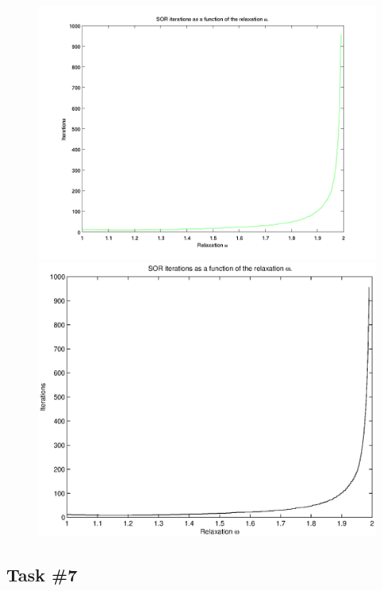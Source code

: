 \documentclass[10pt, a4paper]{article}
\begin{document}
\begin{figure}[hbt]
\begin{center}
\ifpdf
	\includegraphics[width=\linewidth]{../img/task6_plot.png}
\else
	\includegraphics[width=\linewidth]{../img/task6_plot.eps}
\fi
\end{center}
\label{fig+task6}
\caption{}
\end{figure}

\subsection{Task \#7}
\end{document}
